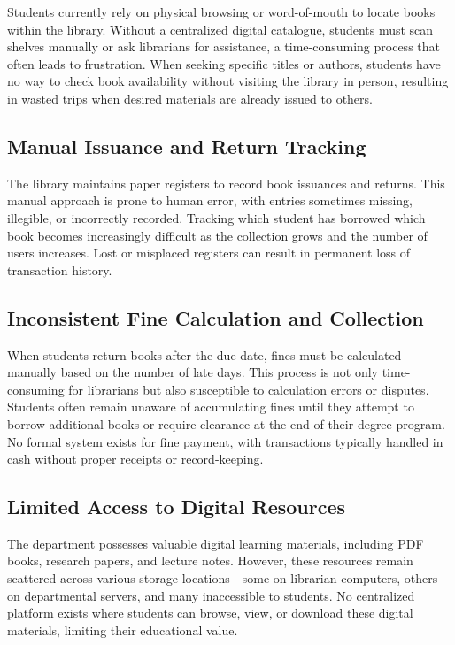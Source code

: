 \documentclass[12pt,a4paper]{report}
\begin{document}
Students currently rely on physical browsing or word-of-mouth to locate books within the library. Without a centralized digital catalogue, students must scan shelves manually or ask librarians for assistance, a time-consuming process that often leads to frustration. When seeking specific titles or authors, students have no way to check book availability without visiting the library in person, resulting in wasted trips when desired materials are already issued to others.

\subsection{Manual Issuance and Return Tracking}

The library maintains paper registers to record book issuances and returns. This manual approach is prone to human error, with entries sometimes missing, illegible, or incorrectly recorded. Tracking which student has borrowed which book becomes increasingly difficult as the collection grows and the number of users increases. Lost or misplaced registers can result in permanent loss of transaction history.

\subsection{Inconsistent Fine Calculation and Collection}

When students return books after the due date, fines must be calculated manually based on the number of late days. This process is not only time-consuming for librarians but also susceptible to calculation errors or disputes. Students often remain unaware of accumulating fines until they attempt to borrow additional books or require clearance at the end of their degree program. No formal system exists for fine payment, with transactions typically handled in cash without proper receipts or record-keeping.

\subsection{Limited Access to Digital Resources}

The department possesses valuable digital learning materials, including PDF books, research papers, and lecture notes. However, these resources remain scattered across various storage locations—some on librarian computers, others on departmental servers, and many inaccessible to students. No centralized platform exists where students can browse, view, or download these digital materials, limiting their educational value.
\end{document}
